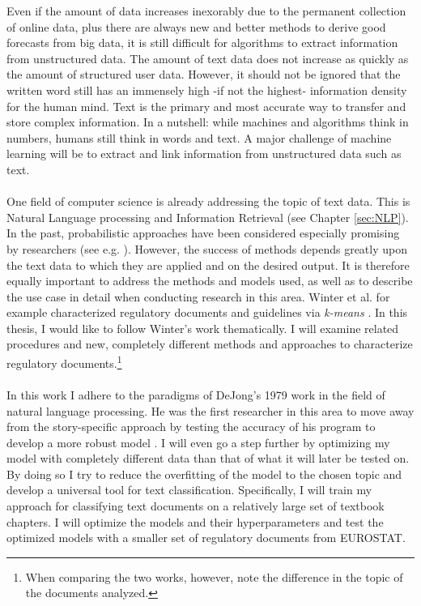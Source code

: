 \documentclass[11pt,a4paper]{article}
\begin{document}
Even if the amount of data increases inexorably due to the permanent collection of online data, plus there are always new and better methods to derive good forecasts from big data, it is still difficult for algorithms to extract information from unstructured data. The amount of text data does not increase as quickly as the amount of structured user data. However, it should not be ignored that the written word still has an immensely high -if not the highest- information density for the human mind. Text is the primary and most accurate way to transfer and store complex information. In a nutshell: while machines and algorithms think in numbers, humans still think in words and text. A major challenge of machine learning will be to extract and link information from unstructured data such as text.\\
\ \\
One field of computer science is already addressing the topic of text data. This is Natural Language processing and Information Retrieval (see Chapter \ref{sec:NLP}). In the past, probabilistic approaches have been considered especially promising by researchers (see e.g. \cite{Manning1999}). However, the success of methods depends greatly upon the text data to which they are applied and on the desired output. It is therefore equally important to address the methods and models used, as well as to describe the use case in detail when conducting research in this area. Winter et al. for example characterized regulatory documents and guidelines via \textit{k-means} \cite{Winter2017}. In this thesis, I would like to follow Winter's work thematically. I will examine related procedures and new, completely different methods and approaches to characterize regulatory documents.\footnote{When comparing the two works, however, note the difference in the topic of the documents analyzed.}\\
\ \\
In this work I adhere to the paradigms of DeJong's 1979 work in the field of natural language processing. He was the first researcher in this area to move away from the story-specific approach by testing the accuracy of his program to develop a more robust model \cite{DeJong1979}. I will even go a step further by optimizing my model with completely different data than that of what it will later be tested on. By doing so I try to reduce the overfitting of the model to the chosen topic and develop a universal tool for text classification. Specifically, I will train my approach for classifying text documents on a relatively large set of textbook chapters. I will optimize the models and their hyperparameters and test the optimized models with a smaller set of regulatory documents from EUROSTAT.\\
\end{document}
